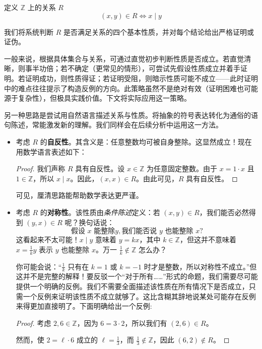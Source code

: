 \begin{example}\label{ex:example6.2.16}
    定义 $\mathbb{Z}$ 上的关系 $R$
    \[(x, y) \in R \iff x \mid y\]

    我们将系统判断 $R$ 是否满足关系的四个基本性质，并对每个结论给出严格证明或证伪。

    一般来说，根据具体集合与关系，可通过直觉初步判断性质是否成立。若直觉清晰，则事半功倍；若不确定（更常见的情形），可尝试先假设性质成立并着手证明。若证明成功，则性质得证；若证明受阻，则暗示性质可能不成立——此时证明中的难点往往提示了构造反例的方向。此策略虽然不是绝对有效（证明困难也可能源于复杂性），但极具实践价值。下文将实际应用这一策略。

    另一种思路是尝试用自然语言描述关系与性质。将抽象的符号表达转化为通俗的语句陈述，常能激发新的理解。我们同样会在后续分析中运用这一方法。

    \begin{itemize}
        \item 考虑 $R$ 的\textbf{自反性}。其含义是：任意整数均可被自身整除。这显然成立！现在用数学语言表述如下：
        \begin{proof}
            我们声称 $R$ 具有自反性。设 $x \in \mathbb{Z}$ 为任意固定整数。由于 $x = 1 \cdot x$ 且 $1 \in \mathbb{Z}$，所以 $x \mid x$。因此，$(x, x) \in R$。由此可见，$R$ 具有自反性。
        \end{proof}
        可见，厘清思路能帮助数学表达更严谨。\\

        \item 考虑 $R$ 的\textbf{对称性}。该性质由\emph{条件陈述}定义：若 $(x, y) \in R$，我们能否必然得到 $(y, x) \in R$ 呢？换句话说：
        \[\text{假设\ } x \text{\ 能整除} y, \text{我们能否说\ } y \text{\ 也能整除\ } x \text{?} \]
        这看起来不太可能！$x \mid y$ 意味着 $y = kx$，其中 $k \in \mathbb{Z}$，但这并不意味着 $x = \frac{1}{k}y$ 表示 $y$ 也能整除 $x$。万一 $\frac{1}{k} \notin \mathbb{Z}$ 怎么办？

        你可能会说：``$\frac{1}{k}$ 只有在 $k = 1$ 或 $k = -1$ 时才是整数，所以对称性不成立。''但这并不是完整的解释！要反驳一个``对于所有……''形式的命题，我们需要尽可能提供一个明确的反例。我们不需要全面描述该性质在所有情况下是否成立，只需一个反例来证明该性质不成立就够了。这比含糊其辞地说某处可能存在反例来得更加直接明了。下面明确给出一个反例:
        \begin{proof}
            考虑 $2,6 \in \mathbb{Z}$，因为 $6=3 \cdot 2$，所以我们有 $(2,6) \in R$。

            然而，使 $2 = \ell \cdot 6$ 成立的 $\ell = \frac{1}{3}$，而 $\frac{1}{3} \notin \mathbb{Z}$，因此 $(6,2) \notin R$。


\end{proof}
\end{itemize}
\end{example}
